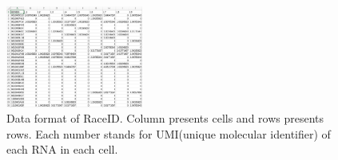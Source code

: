\documentclass[10pt,journal]{IEEEtran}
\begin{document}
 \begin{figure}[H] 
\centering
\includegraphics[width=0.4\textwidth]{fig2/data1.png} 
\caption{Data format of RaceID. Column presents cells and rows presents rows. Each number stands for UMI(unique molecular identifier) of each RNA in each cell.} 
\label{Fig.2}
\end{figure}
\end{document}
